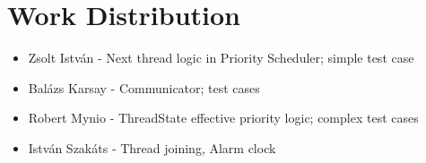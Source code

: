 \documentclass[a4paper,10pt]{article}
\begin{document}
\section{Work Distribution}
\begin{itemize}
\item Zsolt Istv\'{a}n - Next thread logic in Priority Scheduler; simple test case
\item Bal\'{a}zs Karsay - Communicator; test cases
\item Robert Mynio - ThreadState effective priority logic; complex test cases
\item Istv\'{a}n Szak\'{a}ts - Thread joining, Alarm clock

\end{itemize}
\end{document}

